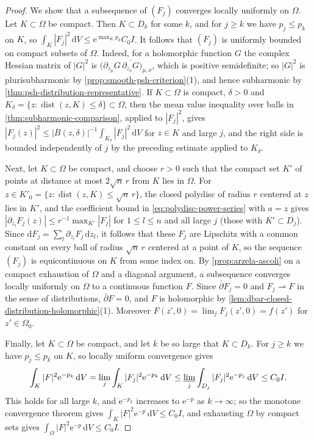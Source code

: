 \begin{proof}
We show that a subsequence of $(F_j)$ converges locally uniformly on $\Omega$. Let $K\subset\Omega$ be compact. Then $K\subset D_k$ for some $k$, and for $j\ge k$ we have $p_j\le p_k$ on $K$, so $\int_K|F_j|^2\,\mathrm dV\le\mathrm e^{\max_Kp_k}C_0I$. It follows that $(F_j)$ is uniformly bounded on compact subsets of $\Omega$. Indeed, for a holomorphic function $G$ the complex Hessian matrix of $|G|^2$ is $\bigl(\partial_{z_\mu}G\,\overline{\partial_{z_\nu}G}\bigr)_{\mu,\nu}$, which is positive semidefinite; so $|G|^2$ is plurisubharmonic by \cref{prop:smooth-psh-criterion}(1), and hence subharmonic by \cref{thm:psh-distribution-representative}. If $K\subset\Omega$ is compact, $\delta>0$ and $K_\delta=\{z:\operatorname{dist}(z,K)\le\delta\}\subset\Omega$, then the mean value inequality over balls in \cref{thm:subharmonic-comparison}, applied to $|F_j|^2$, gives $|F_j(z)|^2\le|B(z,\delta)|^{-1}\int_{K_\delta}|F_j|^2\,\mathrm dV$ for $z\in K$ and large $j$, and the right side is bounded independently of $j$ by the preceding estimate applied to $K_\delta$.

Next, let $K\subset\Omega$ be compact, and choose $r>0$ such that the compact set $K'$ of points at distance at most $2\sqrt n\,r$ from $K$ lies in $\Omega$. For $z\in K'_0=\{z:\operatorname{dist}(z,K)\le\sqrt n\,r\}$, the closed polydisc of radius $r$ centered at $z$ lies in $K'$, and the coefficient bound in \eqref{eq:polydisc-power-series} with $a=z$ gives $|\partial_{z_l}F_j(z)|\le r^{-1}\max_{K'}|F_j|$ for $1\le l\le n$ and all large $j$ (those with $K'\subset D_j$). Since $\mathrm dF_j=\sum_l\partial_{z_l}F_j\,\mathrm dz_l$, it follows that these $F_j$ are Lipschitz with a common constant on every ball of radius $\sqrt n\,r$ centered at a point of $K$, so the sequence $(F_j)$ is equicontinuous on $K$ from some index on. By \cref{prop:arzela-ascoli} on a compact exhaustion of $\Omega$ and a diagonal argument, a subsequence converges locally uniformly on $\Omega$ to a continuous function $F$. Since $\bar\partial F_j=0$ and $F_j\rightharpoonup F$ in the sense of distributions, $\bar\partial F=0$, and $F$ is holomorphic by \cref{lem:dbar-closed-distribution-holomorphic}(1). Moreover $F(z',0)=\lim_jF_j(z',0)=f(z')$ for $z'\in\Omega_0$.

Finally, let $K\subset\Omega$ be compact, and let $k$ be so large that $K\subset D_k$. For $j\ge k$ we have $p_j\le p_k$ on $K$, so locally uniform convergence gives
\[
 \int_K|F|^2\mathrm e^{-p_k}\,\mathrm dV=\lim_j\int_K|F_j|^2\mathrm e^{-p_k}\,\mathrm dV\le\varliminf_j\int_{D_j}|F_j|^2\mathrm e^{-p_j}\,\mathrm dV\le C_0I.
\]
This holds for all large $k$, and $\mathrm e^{-p_k}$ increases to $\mathrm e^{-p}$ as $k\to\infty$; so the monotone convergence theorem gives $\int_K|F|^2\mathrm e^{-p}\,\mathrm dV\le C_0I$, and exhausting $\Omega$ by compact sets gives $\int_\Omega|F|^2\mathrm e^{-p}\,\mathrm dV\le C_0I$.
\end{proof}

